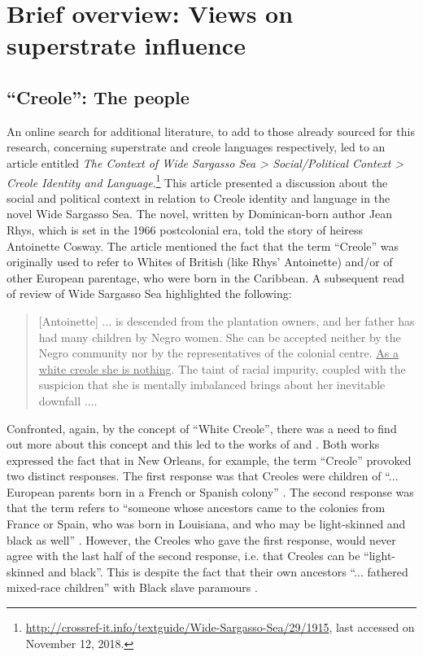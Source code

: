 \chapter{Brief overview: Views on superstrate influence}\label{ch:2}

 \section {``Creole'': The people} \label{2.1}
 An online search for additional literature, to add to those already sourced for this research, concerning superstrate and creole languages respectively, led to an article entitled \textit{The Context of Wide Sargasso Sea > Social\slash Political Context > Creole Identity and Language}.\footnote{\url{http://crossref-it.info/textguide/Wide-Sargasso-Sea/29/1915}, last accessed on November 12, 2018.} This article presented a discussion about the social and political context in relation to Creole identity and language in the novel Wide Sargasso Sea. The novel, written by Dominican-born author Jean Rhys, which is set in the 1966 postcolonial era, told the story of heiress Antoinette Cosway. The article mentioned the fact that the term ``Creole'' was originally used to refer to Whites of British (like Rhys' Antoinette) and/or of other European parentage, who were born in the Caribbean. A subsequent read of   review of Wide Sargasso Sea highlighted the following:
 
  \begin{quotation}
[Antoinette] ... is descended from the plantation owners, and her father has had many children by Negro women. She can be accepted neither by the Negro community nor by the representatives of the colonial centre. \underline {As a white creole she is nothing}. The taint of racial impurity, coupled with the suspicion that she is mentally imbalanced brings about her inevitable downfall .... 
\end{quotation}

Confronted, again, by the concept of ``White Creole'', there was a need to find out more about this concept and this led to the works of \citet{Saxon89} and \citet{Ward04}. Both works expressed the fact that in New Orleans, for example, the term ``Creole'' provoked two distinct responses. The first response was that Creoles were children of  ``... European parents born in a French or Spanish colony'' \citep[270]{Saxon89}. The second response was that the term refers to ``someone whose ancestors came to the colonies from France or Spain, who was born in Louisiana, and who may be light-skinned and black as well'' \citep[xiv]{Ward04}. However, the Creoles who gave the first response, would never agree with the last half of the second response, i.e. that Creoles can be ``light-skinned and black''. This is despite the fact that their own ancestors ``... fathered mixed-race children'' with Black slave paramours \citep[xiv]{Ward04}.

